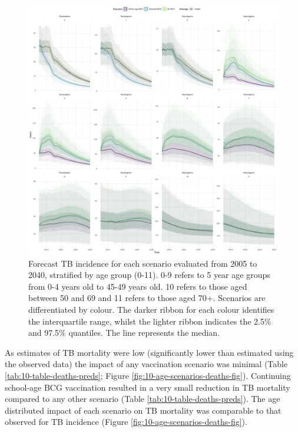 \documentclass[11pt,twoside]{bristolthesis}
\begin{document}
  \begin{figure}
  
  {\centering \includegraphics[width=0.8\linewidth]{chapters/model-fitting/plots/overview-scenarios-future-age-1} 
  
  }
  
  \caption[Forecast TB incidence for each scenario evaluated from 2005 to 2040, stratified by age group.]{Forecast TB incidence for each scenario evaluated from 2005 to 2040, stratified by age group (0-11). 0-9 refers to 5 year age groups from 0-4 years old to 45-49 years old. 10 refers to those aged between 50 and 69 and 11 refers to those aged 70+. Scenarios are differentiated by colour. The darker ribbon for each colour identifies the interquartile range, whilst the lighter ribbon indicates the 2.5\% and 97.5\% quantiles. The line represents the median.}\label{fig:10-age-scenarios-fig}
  \end{figure}
  As estimates of TB mortality were low (significantly lower than estimated using the observed data) the impact of any vaccination scenario was minimal (Table \ref{tab:10-table-deaths-preds}; Figure \ref{fig:10-age-scenarios-deaths-fig}). Continuing school-age BCG vaccination resulted in a very small reduction in TB mortality compared to any other scenario (Table \ref{tab:10-table-deaths-preds}). The age distributed impact of each scenario on TB mortality was comparable to that observed for TB incidence (Figure \ref{fig:10-age-scenarios-deaths-fig}).
\end{document}
